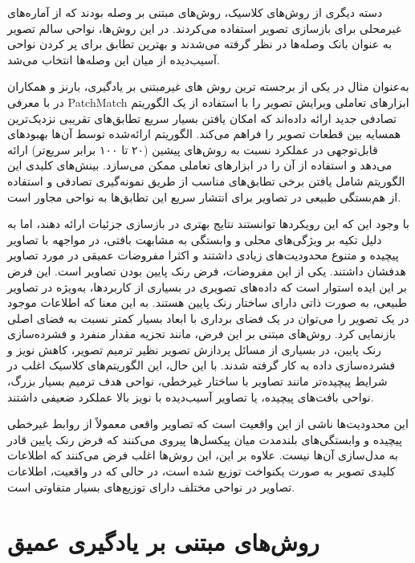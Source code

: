 دسته دیگری از روش‌های کلاسیک، روش‌های مبتنی بر وصله  بودند که از آماره‌های غیرمحلی برای بازسازی تصویر استفاده می‌کردند. در این روش‌ها، نواحی سالم تصویر به عنوان بانک وصله‌ها در نظر گرفته می‌شدند و بهترین تطابق برای پر کردن نواحی آسیب‌دیده از میان این وصله‌ها انتخاب می‌شد.

به‌عنوان مثال در یکی از برجسته ترین روش های غیرمبتنی بر یادگیری، بارنز و همکاران در \cite{barnesPatchMatchRandomizedCorrespondence2009} با معرفی PatchMatch ابزارهای تعاملی ویرایش تصویر را با استفاده از یک الگوریتم تصادفی جدید ارائه داده‌اند که امکان یافتن بسیار سریع تطابق‌های تقریبی نزدیک‌ترین همسایه بین قطعات تصویر را فراهم می‌کند. الگوریتم ارائه‌شده توسط آن‌ها بهبودهای قابل‌توجهی در عملکرد نسبت به روش‌های پیشین (۲۰ تا ۱۰۰ برابر سریع‌تر) ارائه می‌دهد و استفاده از آن را در ابزارهای تعاملی ممکن می‌سازد. بینش‌های کلیدی این الگوریتم شامل یافتن برخی تطابق‌های مناسب از طریق نمونه‌گیری تصادفی و استفاده از هم‌بستگی طبیعی در تصاویر برای انتشار سریع این تطابق‌ها به نواحی مجاور است.

با وجود این که این رویکردها توانستند نتایج بهتری در بازسازی جزئیات ارائه دهند، اما به دلیل تکیه بر ویژگی‌های محلی و وابستگی به مشابهت بافتی، در مواجهه با تصاویر پیچیده و متنوع محدودیت‌های زیادی داشتند و اکثرا مفروضات عمیقی در مورد تصاویر هدفشان داشتند. یکی از این مفروضات، فرض رنک پایین بودن تصاویر است. این فرض بر این ایده استوار است که داده‌های تصویری در بسیاری از کاربردها، به‌ویژه در تصاویر طبیعی، به صورت ذاتی دارای ساختار رنک پایین هستند. به این معنا که اطلاعات موجود در یک تصویر را می‌توان در یک فضای برداری با ابعاد بسیار کمتر نسبت به فضای اصلی بازنمایی کرد. روش‌های مبتنی بر این فرض، مانند تجزیه مقدار منفرد 
\cite{yaghmaeeImprovingImageInpainting2020}
 و فشرده‌سازی رنک پایین، در بسیاری از مسائل پردازش تصویر نظیر ترمیم تصویر، کاهش نویز و فشرده‌سازی داده به کار گرفته شدند. با این حال، این الگوریتم‌های کلاسیک اغلب در شرایط پیچیده‌تر مانند تصاویر با ساختار غیرخطی، نواحی هدف ترمیم بسیار بزرگ، نواحی بافت‌های پیچیده، یا تصاویر آسیب‌دیده با نویز بالا عملکرد ضعیفی داشتند.

این محدودیت‌ها ناشی از این واقعیت است که تصاویر واقعی معمولاً از روابط غیرخطی پیچیده و وابستگی‌های بلندمدت میان پیکسل‌ها پیروی می‌کنند که فرض رنک پایین قادر به مدل‌سازی آن‌ها نیست. علاوه بر این، این روش‌ها اغلب فرض می‌کنند که اطلاعات کلیدی تصویر به صورت یکنواخت توزیع شده است، در حالی که در واقعیت، اطلاعات تصاویر در نواحی مختلف دارای توزیع‌های بسیار متفاوتی است.


\section{روش‌های مبتنی بر یادگیری عمیق}

